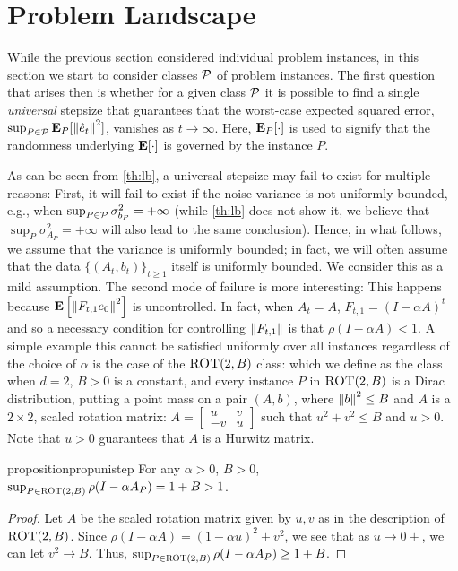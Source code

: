 \section{Problem Landscape}\label{sec:land}
While the previous section considered individual problem instances, in this section we start
to consider classes $\mathcal{P}$ of problem instances.
The first question that arises then is whether for a given class $\mathcal{P}$ it is possible to find a single
\emph{universal} stepsize that guarantees that the worst-case expected squared error,
$\sup_{P\in \mathcal{P}} \mathbf{E}_P[ \left\| \hat{e}_t\right\|^2 ]$, vanishes as $t\to\infty$. Here, $\mathbf{E}_P[\cdot]$ is used to
signify that the randomness underlying $\mathbf{E}[\cdot]$ is governed by the instance $P$.

As can be seen from \cref{th:lb},
a universal stepsize may fail to exist for multiple reasons: 
First, it will fail to exist if the noise variance is not uniformly bounded, e.g.,
when $\sup_{P\in \mathcal{P}} \sigma^2_{b_P}=+\infty$
(while \cref{th:lb} does not show it, we believe that $\sup_{P} \sigma^2_{A_P}=+\infty$ will also
lead to the same conclusion).
Hence, in what follows, we assume that the variance is uniformly bounded; in fact, we will often
assume that the data $\{(A_t,b_t)\}_{t\ge 1}$ itself is uniformly bounded.
We consider this as a mild assumption.
The second mode of failure is more interesting: This happens because $\mathbf{E}\left[\left\| F_{t,1} e_0\right\|^2\right]$ 
is uncontrolled. In fact, when $A_t = A$, $F_{t,1} = (I-\alpha A)^t$ and so a necessary condition
for controlling $\left\| F_{t,1}\right\|$ is that $\rho(I-\alpha A)<1$.
A simple example this cannot be satisfied uniformly over all instances regardless of the choice of $\alpha$
is the case of  the $\text{\sc ROT}(2,B)$ class: 
which we define as the class when $d=2$, $B>0$ is a constant,
and every instance $P$ in $\text{\sc ROT}(2,B)$ is a Dirac distribution,
putting a point mass on a pair $(A,b)$, where $\left\| b\right\|^2\le B$ 
and $A$ is a $2\times 2$, scaled rotation matrix:
$A=\left[\begin{matrix} u &v \\ -v & u\end{matrix}\right]$ such that $u^2+v^2\leq B$ and $u>0$.
Note that $u>0$ guarantees that $A$ is a Hurwitz matrix.
\begin{restatable}{proposition}{propunistep}\label{prop:unistep}
For any $\alpha>0$, $B>0$, $\sup_{P\in \text{\sc ROT}(2,B)}  \rho(I-\alpha A_P) =1+ B> 1$.
\end{restatable}
\begin{proof}
Let $A$ be the scaled rotation matrix given by $u,v$ as in the description of $\text{\sc ROT}(2,B)$.
Since $\rho(I-\alpha A)=(1-\alpha u)^2+v^2$, we see that as $u\to 0+$, we can let $v^2 \to B$.
Thus, $\sup_{P\in \text{\sc ROT}(2,B)}  \rho(I-\alpha A_P) \ge 1+B$.
\end{proof}

